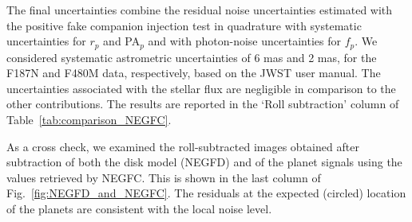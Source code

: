 \documentclass[longauth]{aa}
\newcommand{\vc}[1]{#1}
\begin{document}
\begin{appendix}

The final uncertainties combine the residual noise uncertainties estimated with the positive fake companion injection test in quadrature with systematic uncertainties for $r_p$ and PA$_p$ and with photon-noise \vc{uncertainties} for $f_p$. We considered systematic astrometric uncertainties of 6 mas and 2 mas, for the F187N and F480M data, respectively, based on the JWST user manual. The uncertainties associated with the stellar flux are negligible in comparison to the other contributions. The results are reported in the `Roll subtraction' column of Table~\ref{tab:comparison_NEGFC}.

As a cross check, we examined the roll-subtracted images obtained after subtraction of both the disk model (NEGFD) and of the planet signals using the values retrieved by NEGFC. This is shown in the last column of Fig.~\ref{fig:NEGFD_and_NEGFC}. The residuals at the expected (circled) location of the planets are consistent with the local noise level.


\end{appendix}
\end{document}
